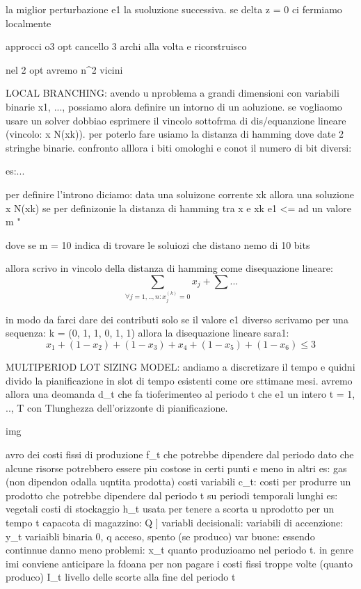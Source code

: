 la miglior perturbazione e1 la suoluzione successiva.
se delta z = 0 ci fermiamo localmente 

approcci o3 opt cancello 3 archi alla volta e ricorstruisco 

nel 2 opt avremo n^2 vicini





LOCAL BRANCHING:
avendo u nproblema a grandi dimensioni con variabili binarie x1, ...,  possiamo alora definire un intorno di un aoluzione. se vogliaomo usare un solver dobbiao esprimere il vincolo sottofrma di dis/equanzione lineare (vincolo: x \in N(xk)). per poterlo fare usiamo la distanza di hamming dove date 2 stringhe binarie. confronto alllora i biti omologhi e conot il numero di bit diversi:

es:...

per definire l'introno diciamo: data una soluizone corrente xk allora una soluzione x \in N(xk) se per definizonie la distanza di hamming tra x e xk e1 <= ad un valore m "
$$$$

dove se m = 10 indica di trovare le soluiozi che distano nemo di 10 bits

allora scrivo in vincolo della distanza di hamming come disequazione lineare:
$$\sum_{\forall j =1, .., n: x_j^(k) = 0} x_j + \sum ...$$

in modo da farci dare dei contributi solo se il valore e1 diverso scrivamo per una sequenza: k = (0, 1, 1, 0, 1, 1) allora la disequazione lineare sara1:
$$x_1 + (1-x_2) + (1-x_3) + x_4 + (1-x_5) + (1-x_6) \leq 3$$









MULTIPERIOD LOT SIZING MODEL:
andiamo a discretizare il tempo e quidni divido la pianificazione in slot di tempo esistenti come ore sttimane mesi. avremo allora una deomanda d_t che fa tioferimenteo al periodo t che e1 un intero t = 1, .., T con Tlunghezza dell'orizzonte di pianificazione.

img

avro dei costi fissi di produzione f_t che potrebbe dipendere dal periodo dato che alcune risorse potrebbero essere piu costose in certi punti e meno in altri es: gas (non dipendon odalla uqntita prodotta)
costi variabili c_t: costi per produrre un prodotto che potrebbe dipendere dal periodo t su periodi temporali lunghi es: vegetali
costi di stockaggio h_t usata per tenere a scorta u nprodotto per un tempo t
capacota di magazzino: Q
]
variabli decisionali:
variabili di accenzione: y_t variaibli binaria 0, q acceso, spento (se produco)
var buone: essendo continnue danno meno problemi:
x_t quanto produzioamo nel periodo t. in genre imi conviene anticipare la fdoana per non pagare i costi fissi troppe volte (quanto produco)
I_t livello delle scorte alla fine del periodo t


